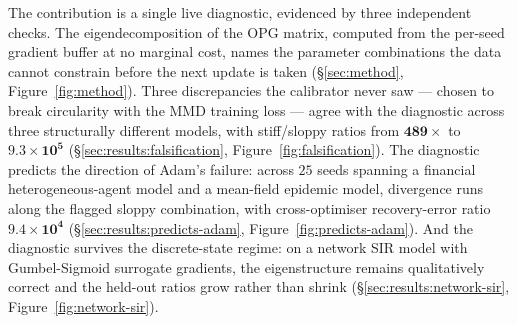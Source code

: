 The contribution is a single live diagnostic, evidenced by three
independent checks. The eigendecomposition of the OPG matrix,
computed from the per-seed gradient buffer at no marginal cost, names
the parameter combinations the data cannot constrain before the next
update is taken (\S\ref{sec:method}, Figure~\ref{fig:method}). Three
discrepancies the calibrator never saw --- chosen to break
circularity with the MMD training loss --- agree with the diagnostic
across three structurally different models, with stiff/sloppy ratios
from $\mathbf{489\times}$ to $\mathbf{9.3 \times 10^5}$
(\S\ref{sec:results:falsification}, Figure~\ref{fig:falsification}).
The diagnostic predicts the direction of Adam's failure: across $25$
seeds spanning a financial heterogeneous-agent model and a mean-field
epidemic model, divergence runs along the flagged sloppy combination,
with cross-optimiser recovery-error ratio $\mathbf{9.4 \times 10^4}$
(\S\ref{sec:results:predicts-adam}, Figure~\ref{fig:predicts-adam}).
And the diagnostic survives the discrete-state regime: on a network
SIR model with Gumbel-Sigmoid surrogate gradients, the eigenstructure
remains qualitatively correct and the held-out ratios grow rather
than shrink (\S\ref{sec:results:network-sir},
Figure~\ref{fig:network-sir}).
